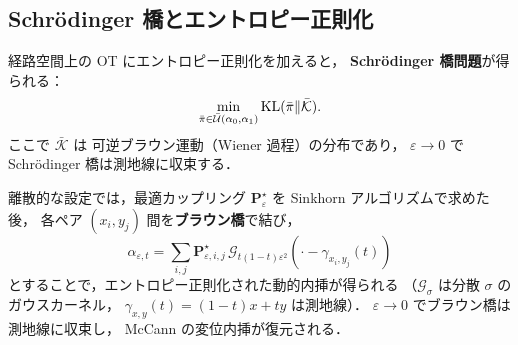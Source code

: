 \subsection{Schr\"{o}dinger 橋とエントロピー正則化}\label{subsec:schrodinger}

経路空間上の OT にエントロピー正則化を加えると，
\textbf{Schr\"{o}dinger 橋問題}が得られる：
\begin{equation}\label{eq:schrodinger}
  \min_{\bar{\pi} \in \bar{\mathcal{U}}(\alpha_0, \alpha_1)}
  \operatorname{KL}(\bar{\pi} \| \bar{\mathcal{K}}).
\end{equation}
ここで $\bar{\mathcal{K}}$ は
可逆ブラウン運動（Wiener 過程）の分布であり，
$\varepsilon \to 0$ で Schr\"{o}dinger 橋は測地線に収束する．

離散的な設定では，最適カップリング
$\mathbf{P}^\star_\varepsilon$ を Sinkhorn アルゴリズムで求めた後，
各ペア $(x_i, y_j)$ 間を\textbf{ブラウン橋}で結び，
\[
  \alpha_{\varepsilon, t}
  = \sum_{i,j} \mathbf{P}^\star_{\varepsilon, i,j}\,
  \mathcal{G}_{t(1-t)\varepsilon^2}(\cdot - \gamma_{x_i, y_j}(t))
\]
とすることで，エントロピー正則化された動的内挿が得られる
（$\mathcal{G}_\sigma$ は分散 $\sigma$ のガウスカーネル，
$\gamma_{x,y}(t) = (1-t)x + ty$ は測地線）．
$\varepsilon \to 0$ でブラウン橋は測地線に収束し，
McCann の変位内挿が復元される．

